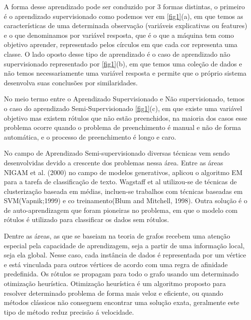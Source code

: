\documentclass[conference]{IEEEtran}
\begin{document}
  A forma desse aprendizado pode ser conduzido por 3 formas distintas\cite{b12}, o primeiro é o aprendizado supervisionado como podemos ver em \ref{fig1}(a), em que temos as características de uma determinada observação (variáveis explicativas ou features) e o que denominamos por variável resposta, que é o que a máquina tem como objetivo aprender, representado pelos círculos em que cada cor representa uma classe. O lado oposto desse tipo de aprendizado é o caso de aprendizado não supervisionado representado por \ref{fig1}(b), em que temos uma coleção de dados e não temos necessariamente uma variável resposta e permite que o próprio sistema desenvolva suas conclusões por similaridades.
  
  No meio termo entre o Aprendizado Supervisionado e Não supervisionado, temos o caso do aprendizado Semi-Supervisionado \ref{fig1}(c), em que existe uma variável objetivo mas existem rótulos que não estão preenchidos, na maioria dos casos esse problema ocorre quando o problema de preenchimento é manual e não de forma automática, e o processo de preenchimento é longo e caro.
  
  No campo de Aprendizado Semi-supervisionado diversas técnicas vem sendo desenvolvidas devido a crescente dos problemas nessa área. Entre as áreas  NIGAM et al. (2000) \cite{b1}  no campo de modelos generativos, aplicou o algoritmo EM para a tarefa de classificação de texto. Wagstaff et al\cite{b14} utilizou-se de técnicas de clusterização baseada em médias, incluen-se trabalhos com técnicas baseadas em SVM(Vapnik;1999\cite{b2}) e co treinamento(Blum and Mitchell, 1998\cite{b3}). Outra solução é o  de auto-aprendizagem que foram pioneiras no problema, em que o modelo com rótulos é utilizado para classificar os dados sem rótulos.
  
  Dentre as áreas, as que se baseiam na teoria de grafos  recebem uma atenção especial pela capacidade de aprendizagem, seja a partir de uma informação local, seja ela global. Nesse caso, cada instância de dados é representada por um vértice e está vinculada para outros vértices de acordo com uma regra de afinidade predefinida. Os rótulos se propagam para todo o grafo usando um determinado otimização heurística. Otimização heurística é um algoritmo proposto para resolver determinado problema de forma mais veloz e eficiente, ou quando métodos clássicos não conseguem encontrar uma solução exata, geralmente este tipo de método reduz %
  precisão á velocidade. 
  
\end{document}
